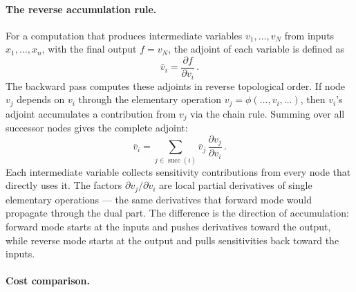 \paragraph{The reverse accumulation rule.}

For a computation that produces intermediate variables
$v_1, \ldots, v_N$ from inputs $x_1, \ldots, x_n$, with the
final output $f = v_N$, the adjoint of each variable is
defined as
%
\begin{equation}
  \bar{v}_i = \frac{\partial f}{\partial v_i} \,.
  \label{eq:adjoint-def}
\end{equation}
%
The backward pass computes these adjoints in reverse
topological order.  If node $v_j$ depends on $v_i$ through
the elementary operation $v_j = \phi(\ldots, v_i, \ldots)$,
then $v_i$'s adjoint accumulates a contribution from $v_j$
via the chain rule.  Summing over all successor nodes gives
the complete adjoint:
%
\begin{equation}
  \bar{v}_i
    = \sum_{j \in \operatorname{succ}(i)}
      \bar{v}_j \,
      \frac{\partial v_j}{\partial v_i} \,.
  \label{eq:adjoint-accumulation}
\end{equation}
%
Each intermediate variable collects sensitivity contributions
from every node that directly uses it.  The factors
$\partial v_j / \partial v_i$ are local partial derivatives
of single elementary operations --- the same derivatives that
forward mode would propagate through the dual part.  The
difference is the direction of accumulation: forward mode
starts at the inputs and pushes derivatives toward the output,
while reverse mode starts at the output and pulls sensitivities
back toward the inputs.

\paragraph{Cost comparison.}

